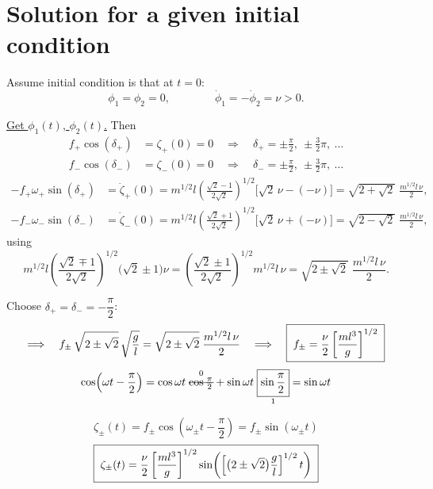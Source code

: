 \documentclass[11pt]{article}
\newcommand{\rmath}[1]{\text{\retracted{\ensuremath{#1}}}}
\begin{document}
\section*{Solution for a given initial condition}

Assume initial condition is that at $t=0$:
\begin{equation*}
  \phi_1 = \phi_2 = 0,
  \qquad\qquad
  \dot\phi_1 = -\dot\phi_2 = \nu > 0 .
\end{equation*}

\noindent\underline{Get $\phi_1(t)$, $\phi_2(t)$.} Then
\begin{align*}
  f_+\cos(\delta_+) &= \zeta_+(0) = 0
    \quad\Longrightarrow\quad \delta_+ = \pm\frac{\pi}{2},\ \pm\frac{3}{2}\pi,\ \dots\\
  f_-\cos(\delta_-) &= \zeta_-(0) = 0
    \quad\Longrightarrow\quad \delta_- = \pm\frac{\pi}{2},\ \pm\frac{3}{2}\pi,\ \dots
\end{align*}
\begin{align*}
  -f_+\omega_+\sin(\delta_+) &= \dot\zeta_+(0)
    = m^{1/2} l \left(\frac{\sqrt2-1}{2\sqrt2}\right)^{1/2}\bigl[\sqrt2\,\nu - (-\nu)\bigr]
    = \sqrt{2+\sqrt2}\;\frac{m^{1/2} l\,\nu}{2},\\
  -f_-\omega_-\sin(\delta_-) &= \dot\zeta_-(0)
    = m^{1/2} l \left(\frac{\sqrt2+1}{2\sqrt2}\right)^{1/2}\bigl[\sqrt2\,\nu + (-\nu)\bigr]
    = \sqrt{2-\sqrt2}\;\frac{m^{1/2} l\,\nu}{2},
\end{align*}
using
\begin{equation*}
  m^{1/2} l \left(\frac{\sqrt2\mp1}{2\sqrt2}\right)^{1/2}\bigl(\sqrt2\pm1\bigr)\nu
  = \left(\frac{\sqrt2\pm1}{2\sqrt2}\right)^{1/2} m^{1/2} l\,\nu
  = \sqrt{2\pm\sqrt2}\;\frac{m^{1/2} l\,\nu}{2}.
\end{equation*}

Choose $\delta_+ = \delta_- = -\dfrac{\pi}{2}$:
\begin{equation*}
  \Longrightarrow\quad
  f_\pm\,\sqrt{2\pm\sqrt2}\,\sqrt{\frac{g}{l}}
    = \sqrt{2\pm\sqrt2}\;\frac{m^{1/2} l\,\nu}{2}
  \quad\Longrightarrow\quad
  \boxed{\;f_\pm = \frac{\nu}{2}\left[\frac{ml^3}{g}\right]^{1/2}\;}
\end{equation*}
\begin{equation*}
  \cos\!\left(\omega t - \frac{\pi}{2}\right)
   = \cos\omega t\;\overset{0}{\rmath{\cos\frac{\pi}{2}}}
   + \sin\omega t\;\underset{1}{\boxed{\sin\frac{\pi}{2}}}
   = \sin\omega t
\end{equation*}

\begin{equation*}
  \zeta_\pm(t) = f_\pm\cos\!\left(\omega_\pm t - \frac{\pi}{2}\right) = f_\pm\sin(\omega_\pm t)
\end{equation*}
\begin{equation*}
  \boxed{\;\zeta_\pm(t) = \frac{\nu}{2}\left[\frac{ml^3}{g}\right]^{1/2}
    \sin\!\left(\left[\bigl(2\pm\sqrt2\bigr)\frac{g}{l}\right]^{1/2} t\right)\;}
\end{equation*}
\end{document}
